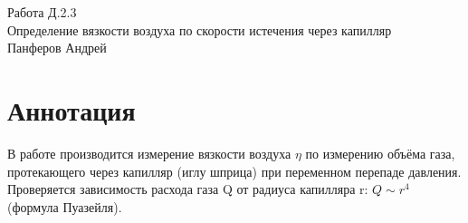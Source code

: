 




\begin{center}
  \LARGE{Работа Д.2.3}\\[0.2cm]
  \LARGE{Определение вязкости воздуха по скорости истечения через капилляр}\\[0.2cm]
  \large{Панферов Андрей}\\[0.2cm]
\end{center}  
  
\section{Аннотация}
В работе производится измерение вязкости воздуха $\eta$ по измерению объёма газа, протекающего через капилляр (иглу шприца) при переменном перепаде давления. Проверяется зависимость расхода газа Q от радиуса капилляра r: $Q \sim r^4$ (формула Пуазейля).
